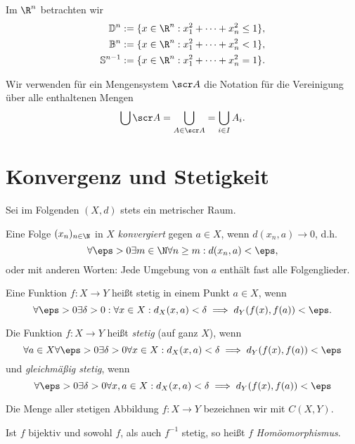 \begin{ex}
	Im $\R^n$ betrachten wir
	\begin{align*}
		\D^n := \{ x \in \R^n : x_1^2 + \dotsb + x_n^2 \le 1 \}, \\
		\B^n := \{ x \in \R^n : x_1^2 + \dotsb + x_n^2 < 1 \}, \\
		\S^{n-1} := \{ x \in \R^n : x_1^2 + \dotsb + x_n^2 = 1 \}.
	\end{align*}
\end{ex}


\begin{nt}
	Wir verwenden für ein Mengensystem $\scr A$ die Notation für die Vereinigung über alle enthaltenen Mengen
	\[
		\bigcup \scr A
		= \bigcup_{A \in \scr A}
		= \bigcup_{i\in I} A_i.
	\]
\end{nt}


\section{Konvergenz und Stetigkeit}

Sei im Folgenden $(X,d)$ stets ein metrischer Raum.

\begin{df}
	Eine Folge $(x_n)_{n\in \N}$ in $X$ \emph{konvergiert} gegen $a \in X$, wenn $d(x_n, a) \to 0$, d.h.
	\[
		\forall \eps > 0 \exists m \in \N \forall n \ge m : d(x_n, a) < \eps,
	\]
	oder mit anderen Worten: Jede Umgebung von $a$ enthält fast alle Folgenglieder.
\end{df}

\begin{df}
	Eine Funktion $f: X \to Y$ heißt stetig in einem Punkt $a \in X$, wenn
	\[
		\forall \eps > 0 \exists \delta > 0 : \forall x \in X : d_X(x,a) < \delta \implies d_Y(f(x), f(a)) < \eps.
	\]

	Die Funktion $f: X \to Y$ heißt \emph{stetig} (auf ganz $X$), wenn
	\[
		\forall a \in X \forall \eps > 0 \exists \delta > 0 \forall x \in X: d_X(x,a) < \delta \implies d_Y(f(x), f(a)) < \eps
	\]
	und \emph{gleichmäßig stetig}, wenn
	\[
		\forall \eps > 0 \exists \delta > 0 \forall x,a \in X: d_X(x,a) < \delta \implies d_Y(f(x), f(a)) < \eps
	\]

	Die Menge aller stetigen Abbildung $f: X \to Y$ bezeichnen wir mit $C(X,Y)$.

	Ist $f$ bijektiv und sowohl $f$, als auch $f^{-1}$ stetig, so heißt $f$ \emph{Homöomorphismus}.
\end{df}

